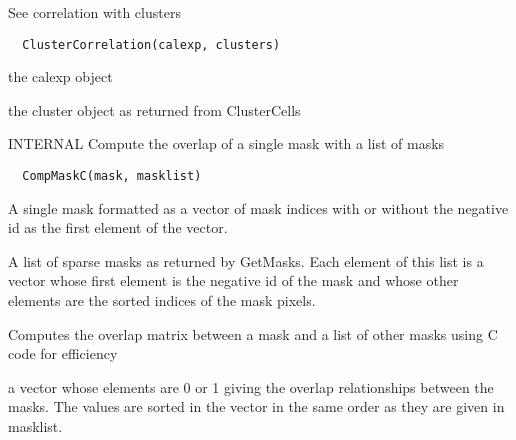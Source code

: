 \documentclass[a4paper]{book}
\begin{document}
%
\begin{Description}\relax
See correlation with clusters
\end{Description}
%
\begin{Usage}
\begin{verbatim}
  ClusterCorrelation(calexp, clusters)
\end{verbatim}
\end{Usage}
%
\begin{Arguments}
\begin{ldescription}
\item[\code{calexp}] the calexp object

\item[\code{clusters}] the cluster object as returned from
ClusterCells
\end{ldescription}
\end{Arguments}
%
\begin{Description}\relax
INTERNAL Compute the overlap of a single mask with a list
of masks
\end{Description}
%
\begin{Usage}
\begin{verbatim}
  CompMaskC(mask, masklist)
\end{verbatim}
\end{Usage}
%
\begin{Arguments}
\begin{ldescription}
\item[\code{mask}] A single mask formatted as a vector of mask
indices with or without the negative id as the first
element of the vector.

\item[\code{masklist}] A list of sparse masks as returned by
GetMasks.  Each element of this list is a vector whose
first element is the negative id of the mask and whose
other elements are the sorted indices of the mask
pixels.
\end{ldescription}
\end{Arguments}
%
\begin{Details}\relax
Computes the overlap matrix between a mask and a list of
other masks using C code for efficiency
\end{Details}
%
\begin{Value}
a vector whose elements are 0 or 1 giving the overlap
relationships between the masks.  The values are sorted
in the vector in the same order as they are given in
masklist.
\end{Value}
\end{document}
